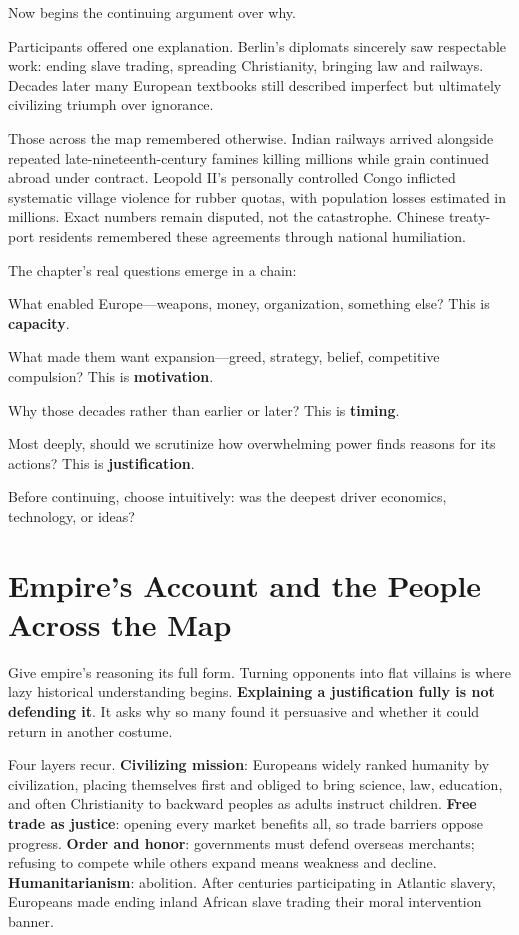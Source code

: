 Now begins the continuing argument over why.

Participants offered one explanation. Berlin's diplomats sincerely saw respectable work: ending slave trading, spreading Christianity, bringing law and railways. Decades later many European textbooks still described imperfect but ultimately civilizing triumph over ignorance.

Those across the map remembered otherwise. Indian railways arrived alongside repeated late-nineteenth-century famines killing millions while grain continued abroad under contract. Leopold II's personally controlled Congo inflicted systematic village violence for rubber quotas, with population losses estimated in millions. Exact numbers remain disputed, not the catastrophe. Chinese treaty-port residents remembered these agreements through national humiliation.

The chapter's real questions emerge in a chain:

What enabled Europe---weapons, money, organization, something else? This is \textbf{capacity}.

What made them want expansion---greed, strategy, belief, competitive compulsion? This is \textbf{motivation}.

Why those decades rather than earlier or later? This is \textbf{timing}.

Most deeply, should we scrutinize how overwhelming power finds reasons for its actions? This is \textbf{justification}.

Before continuing, choose intuitively: was the deepest driver economics, technology, or ideas?

\section[Empire and the People Across the Map]{Empire's Account and the People Across the Map}
Give empire's reasoning its full form. Turning opponents into flat villains is where lazy historical understanding begins. \textbf{Explaining a justification fully is not defending it}. It asks why so many found it persuasive and whether it could return in another costume.

Four layers recur. \textbf{Civilizing mission}: Europeans widely ranked humanity by civilization, placing themselves first and obliged to bring science, law, education, and often Christianity to backward peoples as adults instruct children. \textbf{Free trade as justice}: opening every market benefits all, so trade barriers oppose progress. \textbf{Order and honor}: governments must defend overseas merchants; refusing to compete while others expand means weakness and decline. \textbf{Humanitarianism}: abolition. After centuries participating in Atlantic slavery, Europeans made ending inland African slave trading their moral intervention banner.

